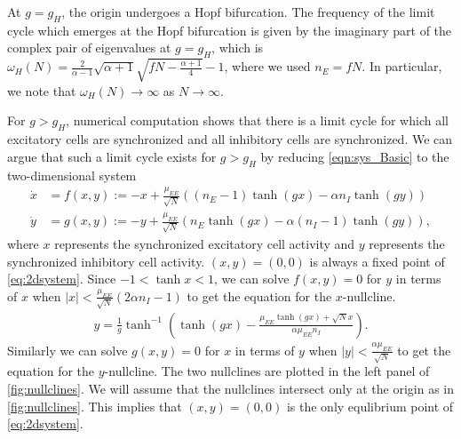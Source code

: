 \documentclass[11pt,reqno]{amsart}
\begin{document}
At $g = g_H$, the origin undergoes a Hopf bifurcation. The frequency of the limit cycle which emerges at the Hopf bifurcation is given by the imaginary part of the complex pair of eigenvalues at $g = g_H$, which is $\omega_H(N) = \frac{2}{\alpha-1}\sqrt{\alpha+1}\sqrt{f N- \frac{\alpha+1}{4}} -1$, where we used $n_E = f N$. In particular, we note that $\omega_H(N) \rightarrow \infty$ as $N \rightarrow \infty$.

For $g > g_H$, numerical computation shows that there is a limit cycle for which all excitatory cells are synchronized and all inhibitory cells are synchronized. We can argue that such a limit cycle exists for $g > g_H$ by reducing \cref{eqn:sys_Basic} to the two-dimensional system
\begin{equation}\label{eq:2dsystem}
\begin{aligned}
\dot{x} &= f(x, y) := -x + \frac{\mu_{EE}}{\sqrt{N}}\left((n_E - 1) \tanh(g x) - \alpha n_I \tanh(g y) \right) \\
\dot{y} &= g(x, y) := -y + \frac{\mu_{EE}}{\sqrt{N}}\left( n_E \tanh(g x) - \alpha (n_I - 1) \tanh(g y) \right), 
\end{aligned}
\end{equation}
where $x$ represents the synchronized excitatory cell activity and $y$ represents the synchronized inhibitory cell activity. $(x, y) = (0, 0)$ is always a fixed point of \cref{eq:2dsystem}. Since $-1 < \tanh x < 1$, we can solve $f(x, y) = 0$ for $y$ in terms of $x$ when $|x| < \frac{\mu_{EE}}{\sqrt{N}}( 2 \alpha n_I - 1)$ to get the equation for the $x$-nullcline.
\begin{align*}
y = \frac{1}{g} \tanh ^{-1} \left( \tanh (g x) - \frac{ \mu_{EE} \tanh (g x) + \sqrt{N} x}{\alpha \mu_{EE} n_I} \right).
\end{align*}
Similarly we can solve $g(x, y) = 0$ for $x$ in terms of $y$ when $|y| < \frac{\alpha \mu_{EE}}{\sqrt{N}}$ to get the equation for the $y$-nullcline. The two nullclines are plotted in the left panel of \cref{fig:nullclines}. We will assume that the nullclines intersect only at the origin as in \cref{fig:nullclines}. This implies that $(x,y) = (0,0)$ is the only equlibrium point of \cref{eq:2dsystem}. 
\end{document}
